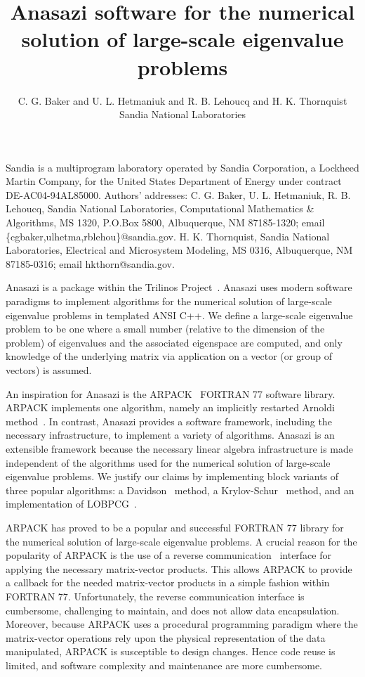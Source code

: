 \documentclass[acmtoms]{acmtrans2m}
\title{Anasazi software for the numerical solution of large-scale eigenvalue problems}
\author{C. G. Baker and
U. L. Hetmaniuk and R. B. Lehoucq and H. K. Thornquist\\ Sandia
National Laboratories}
\newcounter{algorithm}
\begin{document}
\begin{bottomstuff}
Sandia is a multiprogram laboratory operated by Sandia Corporation,
a Lockheed Martin Company, for the United States Department of
Energy under contract DE-AC04-94AL85000. Authors' addresses: C. G.
Baker, U. L. Hetmaniuk, R. B. Lehoucq,
Sandia National Laboratories, Computational Mathematics \&
Algorithms, MS 1320, P.O.Box 5800, Albuquerque, NM 87185-1320; email
\{cgbaker,ulhetma,rblehou\}@sandia.gov. H. K. Thornquist, Sandia National
Laboratories, Electrical and Microsystem Modeling, MS 0316,
Albuquerque, NM 87185-0316; email hkthorn@sandia.gov.

\end{bottomstuff}

\maketitle

Anasazi is a package within the Trilinos
Project~\cite{Heroux:2005:OTP}. Anasazi uses modern software
paradigms to implement algorithms for the numerical solution of
large-scale eigenvalue problems in templated ANSI C++. We define a
large-scale eigenvalue problem to be one where a small number
(relative to the dimension of the problem) of eigenvalues and the
associated eigenspace are computed, and only knowledge of the
underlying matrix via application on a vector (or group of vectors)
is assumed.

An inspiration for Anasazi is the ARPACK~\cite{lesy:98} FORTRAN 77
software library. ARPACK implements one algorithm, namely an
implicitly restarted Arnoldi method~\cite{sore:92}. In contrast,
Anasazi provides a software framework, including the necessary
infrastructure, to implement a variety of algorithms.  Anasazi is an
extensible framework because the necessary linear algebra
infrastructure is made independent of the algorithms used for the
numerical solution of large-scale eigenvalue problems. We justify
our claims by implementing block variants of three popular
algorithms: a Davidson~\cite{davi:75} method, a
Krylov-Schur~\cite{stew:01} method, and an implementation of
LOBPCG~\cite{knya:01}.

ARPACK has proved to be a popular and successful FORTRAN 77 library
for the numerical solution of large-scale eigenvalue problems. A
crucial reason for the popularity of ARPACK is the use of a reverse
communication~\cite[p.~3]{lesy:98} interface for applying the
necessary matrix-vector products. This allows ARPACK to provide a
callback for the needed matrix-vector products in a simple fashion
within FORTRAN 77. Unfortunately, the reverse communication
interface is cumbersome, challenging to maintain, and does not allow
data encapsulation. Moreover, because ARPACK uses a procedural
programming paradigm where the matrix-vector operations rely upon
the physical representation of the data manipulated, ARPACK is
susceptible to design changes. Hence code reuse is limited, and
software complexity and maintenance are more cumbersome.
\end{document}
